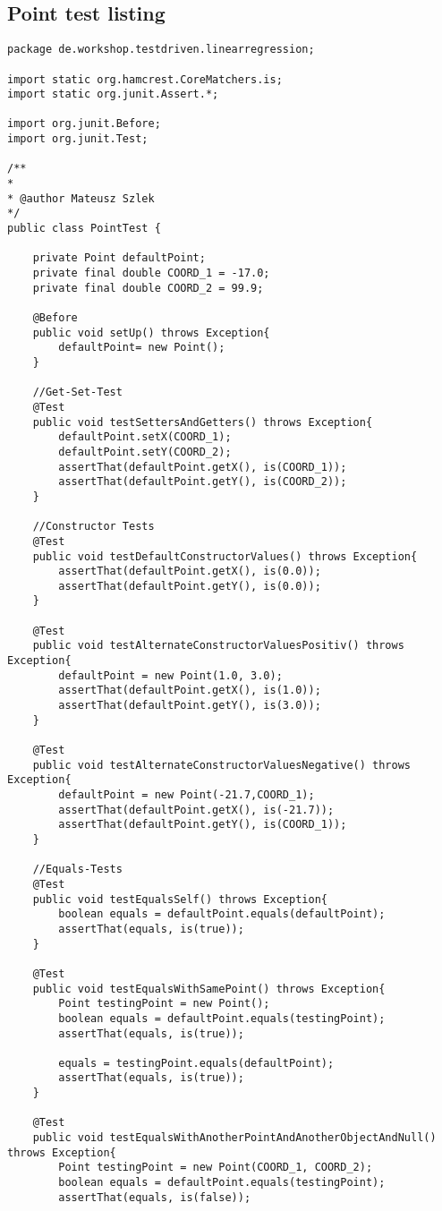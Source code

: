 \subsection{Point test listing}
\label{subsec: point-test-listing}
\begin{lstlisting}
package de.workshop.testdriven.linearregression;

import static org.hamcrest.CoreMatchers.is;
import static org.junit.Assert.*;

import org.junit.Before;
import org.junit.Test;

/**
* 
* @author Mateusz Szlek
*/
public class PointTest {
	
	private Point defaultPoint;
	private final double COORD_1 = -17.0;
	private final double COORD_2 = 99.9;
	
	@Before
	public void setUp() throws Exception{
		defaultPoint= new Point();
	}
	
	//Get-Set-Test
	@Test
	public void testSettersAndGetters() throws Exception{
		defaultPoint.setX(COORD_1);
		defaultPoint.setY(COORD_2);
		assertThat(defaultPoint.getX(), is(COORD_1));
		assertThat(defaultPoint.getY(), is(COORD_2));
	}
	
	//Constructor Tests
	@Test
	public void testDefaultConstructorValues() throws Exception{
		assertThat(defaultPoint.getX(), is(0.0));
		assertThat(defaultPoint.getY(), is(0.0));
	}
	
	@Test
	public void testAlternateConstructorValuesPositiv() throws Exception{
		defaultPoint = new Point(1.0, 3.0);
		assertThat(defaultPoint.getX(), is(1.0));
		assertThat(defaultPoint.getY(), is(3.0));
	}
	
	@Test
	public void testAlternateConstructorValuesNegative() throws Exception{
		defaultPoint = new Point(-21.7,COORD_1);
		assertThat(defaultPoint.getX(), is(-21.7));
		assertThat(defaultPoint.getY(), is(COORD_1));
	}
	
	//Equals-Tests
	@Test
	public void testEqualsSelf() throws Exception{
		boolean equals = defaultPoint.equals(defaultPoint);
		assertThat(equals, is(true));
	}
	
	@Test
	public void testEqualsWithSamePoint() throws Exception{
		Point testingPoint = new Point();
		boolean equals = defaultPoint.equals(testingPoint);
		assertThat(equals, is(true));
		
		equals = testingPoint.equals(defaultPoint);
		assertThat(equals, is(true));
	}
	
	@Test
	public void testEqualsWithAnotherPointAndAnotherObjectAndNull() throws Exception{
		Point testingPoint = new Point(COORD_1, COORD_2);
		boolean equals = defaultPoint.equals(testingPoint);
		assertThat(equals, is(false));
		

\end{lstlisting}
